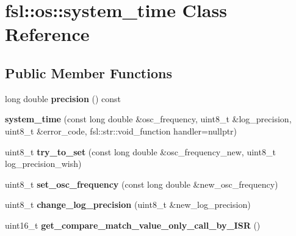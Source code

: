 \hypertarget{classfsl_1_1os_1_1system__time}{}\section{fsl\+::os\+::system\+\_\+time Class Reference}
\label{classfsl_1_1os_1_1system__time}
\subsection*{Public Member Functions}
\begin{DoxyCompactItemize}
\item 
\mbox{\label{classfsl_1_1os_1_1system__time_a92650fe0faf3e53b6f19bfb0a71f6525}} 
long double {\bfseries precision} () const
\item 
\mbox{\label{classfsl_1_1os_1_1system__time_aa3f9d7bfb648531f449aa5b8b4c0144b}} 
{\bfseries system\+\_\+time} (const long double \&osc\+\_\+frequency, uint8\+\_\+t \&log\+\_\+precision, uint8\+\_\+t \&error\+\_\+code, fsl\+::str\+::void\+\_\+function handler=nullptr)
\item 
\mbox{\label{classfsl_1_1os_1_1system__time_a3bc5d80f077ad9c324488c30415377c8}} 
uint8\+\_\+t {\bfseries try\+\_\+to\+\_\+set} (const long double \&osc\+\_\+frequency\+\_\+new, uint8\+\_\+t log\+\_\+precision\+\_\+wish)
\item 
\mbox{\label{classfsl_1_1os_1_1system__time_a39b8a5e38275fcee8de54416082f51aa}} 
uint8\+\_\+t {\bfseries set\+\_\+osc\+\_\+frequency} (const long double \&new\+\_\+osc\+\_\+frequency)
\item 
\mbox{\label{classfsl_1_1os_1_1system__time_a44fa20f6c6f0145c4fc6b05f4a200979}} 
uint8\+\_\+t {\bfseries change\+\_\+log\+\_\+precision} (uint8\+\_\+t \&new\+\_\+log\+\_\+precision)
\item 
\mbox{\label{classfsl_1_1os_1_1system__time_a7cdd84f63eec6be48ee3b0e56c906d5c}} 
uint16\+\_\+t {\bfseries get\+\_\+compare\+\_\+match\+\_\+value\+\_\+only\+\_\+call\+\_\+by\+\_\+\+I\+SR} ()
\item 
\mbox{\label{classfsl_1_1os_1_1system__time_a7fef6a0de8f626d1ae480507f852b656}} 

\end{DoxyCompactItemize}

